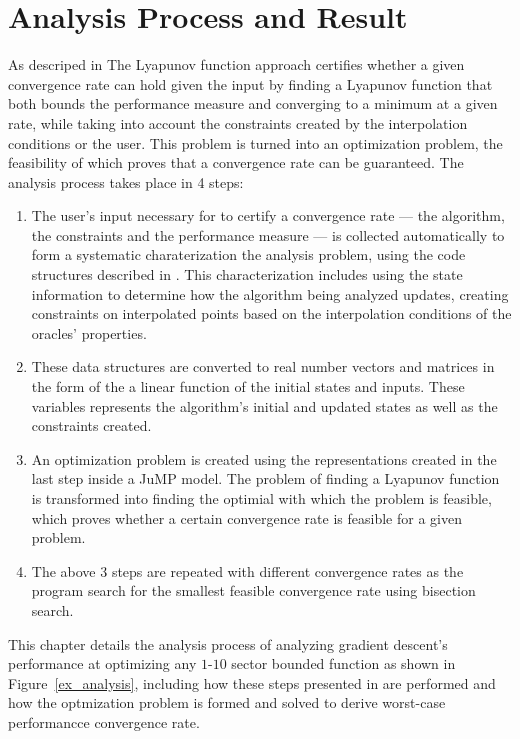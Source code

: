 \chapter{Analysis Process and Result}\label{chapter:result}

As descriped in  The Lyapunov function approach certifies whether a given convergence rate can hold given the input by finding a Lyapunov function that both bounds the performance measure and converging to a minimum at a given rate, while taking into account the constraints created by the interpolation conditions or the user. This problem is turned into an optimization problem, the feasibility of which proves that a convergence rate can be guaranteed. The analysis process takes place in 4 steps:

\begin{enumerate}
    \item The user's input necessary for to certify a convergence rate --- the algorithm, the constraints and the performance measure --- is collected automatically to form a systematic charaterization the analysis problem, using the code structures described in . This characterization includes using the state information to determine how the algorithm being analyzed updates, creating constraints on interpolated points based on the interpolation conditions of the oracles' properties.
    \item These data structures are converted to real number vectors and matrices in the form of the a linear function of the initial states and inputs. These variables represents the algorithm's initial and updated states as well as the constraints created.
    \item An optimization problem is created using the representations created in the last step inside a JuMP model. The problem of finding a Lyapunov function is transformed into finding the optimial with which the problem is feasible, which proves whether a certain convergence rate is feasible for a given problem.
    \item The above 3 steps are repeated with different convergence rates as the program search for the smallest feasible convergence rate using bisection search.
\end{enumerate}

This chapter details the analysis process of analyzing gradient descent's performance at optimizing any $1$-$10$ sector bounded function as shown in Figure~\ref{ex_analysis}, including how these steps presented in  are performed and how the optmization problem is formed and solved to derive worst-case performancce convergence rate.

